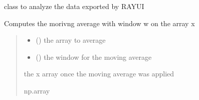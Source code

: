 \documentclass[letterpaper,10pt,english]{sphinxmanual}
\begin{document}
\begin{fulllineitems}
\label{\detokenize{code_documentation:raypyng.postprocessing.PostProcessAnalyzed}}
\pysigstartsignatures
{}
\pysigstopsignatures
\sphinxAtStartPar
class to analyze the data exported by RAY\sphinxhyphen{}UI

\begin{fulllineitems}
\label{\detokenize{code_documentation:raypyng.postprocessing.PostProcessAnalyzed.moving_average}}
\pysigstartsignatures
{}
\pysigstopsignatures
\sphinxAtStartPar
Computes the morivng average with window w on the array x
\begin{quote}\begin{description}
\begin{itemize}
\item {} 
\sphinxAtStartPar
{} () \textendash{} the array to average

\item {} 
\sphinxAtStartPar
{} () \textendash{} the window for the moving average

\end{itemize}

\sphinxAtStartPar
the x array once the moving average was applied

\sphinxAtStartPar
np.array

\end{description}\end{quote}

\end{fulllineitems}



\end{fulllineitems}
\end{document}
